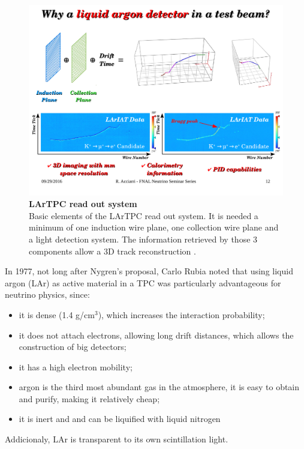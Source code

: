 \begin{figure}
	\begin{center}
		\includegraphics[scale=0.6]{Figures/Acciarri_fig2.pdf}
		\caption[LArTPC read out system]{ {\textbf{LArTPC read out system}} \\ Basic elements of the LArTPC read out system. It is needed a minimum of one induction wire plane, one collection wire plane and a light detection system. The information retrieved by those 3 components allow a 3D track reconstruction \cite{Acciarri_presentation}.}
		\label{lartpc_readout}	
	\end{center}
\end{figure}

\newpage
In 1977, not long after Nygren's proposal, Carlo Rubia noted that using liquid argon (LAr) as active material in a TPC was particularly advantageous for neutrino physics, since:
\begin{itemize}
	\item it is dense (1.4 g/cm$^3$), which increases the interaction probability;
 	\item it does not attach electrons, allowing long drift distances, which allows the construction of big detectors;
  	\item it has a high electron mobility;
   	\item argon is the third most abundant gas in the atmosphere, it is easy to obtain and purify, making it relatively cheap;
  	\item it is inert and and can be liquified with liquid nitrogen \cite{Rubia_ANewConcept}
\end{itemize}
Addicionaly, LAr is transparent to its own scintillation light. 

